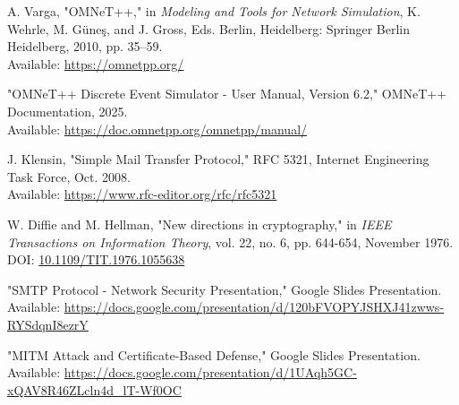 \documentclass[a4paper,12pt]{extarticle}
\begin{document}
\begin{thebibliography}{10}

    A. Varga, "OMNeT++," in \textit{Modeling and Tools for Network Simulation}, K. Wehrle, M. Güneş, and J. Gross, Eds. Berlin, Heidelberg: Springer Berlin Heidelberg, 2010, pp. 35–59. \\
    Available: \href{https://omnetpp.org/}{https://omnetpp.org/}
    
    "OMNeT++ Discrete Event Simulator - User Manual, Version 6.2," OMNeT++ Documentation, 2025. \\
    Available: \href{https://doc.omnetpp.org/omnetpp/manual/}{https://doc.omnetpp.org/omnetpp/manual/}
    

    
    
    
    J. Klensin, "Simple Mail Transfer Protocol," RFC 5321, Internet Engineering Task Force, Oct. 2008. \\
    Available: \href{https://www.rfc-editor.org/rfc/rfc5321}{https://www.rfc-editor.org/rfc/rfc5321}
    
    W. Diffie and M. Hellman, "New directions in cryptography," in \textit{IEEE Transactions on Information Theory}, vol. 22, no. 6, pp. 644-654, November 1976. \\
    DOI: \href{https://doi.org/10.1109/TIT.1976.1055638}{10.1109/TIT.1976.1055638}

    "SMTP Protocol - Network Security Presentation," Google Slides Presentation. \\
    Available: \href{https://docs.google.com/presentation/d/120bFVOPYJSHXJ41zwws-RYSdqnI8ezrY/edit?slide=id.p1#slide=id.p1}{https://docs.google.com/presentation/d/120bFVOPYJSHXJ41zwws-RYSdqnI8ezrY}
    
    "MITM Attack and Certificate-Based Defense," Google Slides Presentation. \\
    Available: \href{https://docs.google.com/presentation/d/1UAqh5GC-xQAV8R46ZLcln4d_lT-Wf0OC/edit?slide=id.g37ece01983c_3_0#slide=id.g37ece01983c_3_0}{https://docs.google.com/presentation/d/1UAqh5GC-xQAV8R46ZLcln4d\_lT-Wf0OC}
    
    
    \end{thebibliography}
\end{document}

